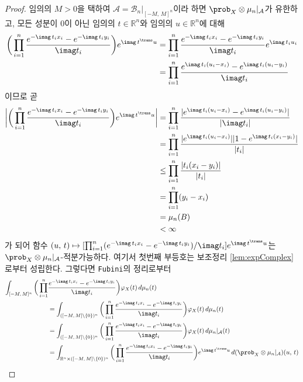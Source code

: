 \begin{proof}
    임의의 $M>0$을 택하여 $\mathcal{A}=\mathcal{B}_n\vert_{[-M,\,M]^n}$이라 하면 $\prob_X\otimes\mu_n\vert_\mathcal{A}$가 유한하고, 모든 성분이 $0$이 아닌 임의의 $t\in\mathbb{R}^n$와 임의의 $u\in\mathbb{R}^n$에 대해
    \begin{align*}
        \bigg(\prod_{i=1}^n\frac{e^{-\imag\,t_ix_i}-e^{-\imag\,t_iy_i}}{\imag t_i}\bigg)e^{\imag\,t^\trans u}&=\prod_{i=1}^n\frac{e^{-\imag\,t_ix_i}-e^{-\imag\,t_iy_i}}{\imag t_i}e^{\imag\,t_iu_i}\\
        &=\prod_{i=1}^n\frac{e^{\imag\,t_i(u_i-x_i)}-e^{\imag\,t_i(u_i-y_i)}}{\imag t_i}
    \end{align*}
    이므로 곧
    \begin{align*}
        \bigg|\bigg(\prod_{i=1}^n\frac{e^{-\imag\,t_ix_i}-e^{-\imag\,t_iy_i}}{\imag t_i}\bigg)e^{\imag\,t^\trans u}\bigg|&=\prod_{i=1}^n\frac{|e^{\imag\,t_i(u_i-x_i)}-e^{\imag\,t_i(u_i-y_i)}|}{|\imag t_i|}\\
        &=\prod_{i=1}^n\frac{|e^{\imag\,t_i(u_i-x_i)}||1-e^{\imag\,t_i(x_i-y_i)}|}{|t_i|}\\
        &\leq\prod_{i=1}^n\frac{|t_i(x_i-y_i)|}{|t_i|}\\
        &=\prod_{i=1}^n(y_i-x_i)\\
        &=\mu_n(B)\\
        &<\infty
    \end{align*}
    가 되어 함수 $(u,\,t)\mapsto[\prod_{i=1}^n(e^{-\imag\,t_ix_i}-e^{-\imag\,t_iy_i})/\imag t_i]e^{\imag\,t^\trans u}$는 $\prob_X\otimes\mu_n\vert_\mathcal{A}$-적분가능하다. 여기서 첫번째 부등호는 보조정리 \ref{lem:expComplex}로부터 성립한다. 그렇다면 \texttt{Fubini}의 정리로부터
    \begin{align*}
        \int_{[-M,\,M]^n}\bigg(\prod_{i=1}^n&\frac{e^{-\imag\,t_ix_i}-e^{-\imag\,t_iy_i}}{\imag t_i}\bigg)\varphi_X(t)\,d\mu_n(t)\\
        &=\int_{([-M,\,M]\setminus\{0\})^n}\bigg(\prod_{i=1}^n\frac{e^{-\imag\,t_ix_i}-e^{-\imag\,t_iy_i}}{\imag t_i}\bigg)\varphi_X(t)\,d\mu_n(t)\\
        &=\int_{([-M,\,M]\setminus\{0\})^n}\bigg(\prod_{i=1}^n\frac{e^{-\imag\,t_ix_i}-e^{-\imag\,t_iy_i}}{\imag t_i}\bigg)\varphi_X(t)\,d\mu_n\vert_\mathcal{A}(t)\\
        &=\int_{\mathbb{R}^n\times([-M,\,M]\setminus\{0\})^n}\bigg(\prod_{i=1}^n\frac{e^{-\imag\,t_ix_i}-e^{-\imag\,t_iy_i}}{\imag t_i}\bigg)e^{\imag\,t^\trans u}\,d(\prob_X\otimes\mu_n\vert_\mathcal{A})(u,\,t)\\

\end{align*}
\end{proof}

